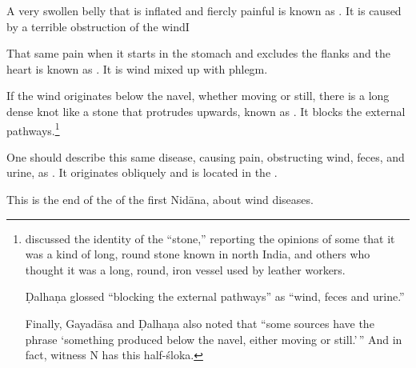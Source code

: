 \begin{translation}
\item [88]

A very swollen belly that is inflated and fiercly painful is known as 
.  It is caused by a terrible 
obstruction of the windI

\item [89]

That same pain when it starts in the stomach and excludes the flanks
and the heart is known as .  
It is wind mixed up with phlegm.

\item[90]

If the wind originates below the navel, whether moving or still, there
is a long dense knot like a stone that protrudes upwards, known as
. It blocks the external
pathways.\footnote{ discussed the identity of the
     “stone,” reporting the opinions of some that it was a
    kind of long, round stone known in north India, and others who thought
    it was a long, round, iron vessel used by leather workers.
    
    Ḍalhaṇa glossed  “blocking the external
pathways” as “wind, feces and urine.”
    
    Finally, Gayadāsa and Ḍalhaṇa also noted that “some sources have the 
    phrase  `something 
    produced below the navel, either moving or still.'\,”  And in fact, 
    witness N has this half-śloka.}



\item[91]

One should describe this same disease, causing pain, obstructing
wind, feces, and urine, as
. It originates obliquely and is located in
the .

\bigskip
{\centering
This is the end of the of the first Nidāna, about wind diseases.
\par}

%

\end{translation}
